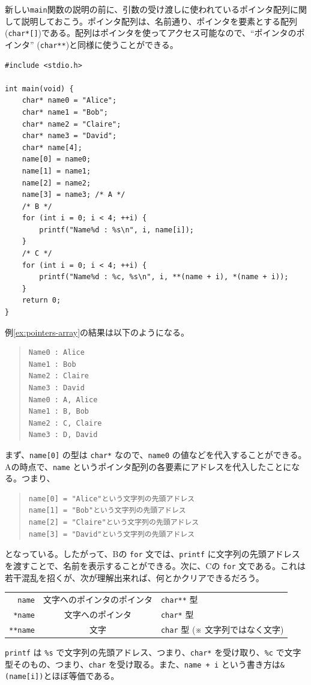 新しい\texttt{main}関数の説明の前に、引数の受け渡しに使われているポインタ配列に関して説明しておこう。ポインタ配列は、名前通り、ポインタを要素とする配列(\texttt{char*[]})である。配列はポインタを使ってアクセス可能なので、``ポインタのポインタ'' (\texttt{char**})と同様に使うことができる。
\begin{reidai}\label{ex:pointers-array}
    \begin{verbatim}
#include <stdio.h>

int main(void) {
    char* name0 = "Alice";
    char* name1 = "Bob";
    char* name2 = "Claire";
    char* name3 = "David";
    char* name[4];
    name[0] = name0;
    name[1] = name1;
    name[2] = name2;
    name[3] = name3; /* A */
    /* B */
    for (int i = 0; i < 4; ++i) {
        printf("Name%d : %s\n", i, name[i]);
    }
    /* C */
    for (int i = 0; i < 4; ++i) {
        printf("Name%d : %c, %s\n", i, **(name + i), *(name + i));
    }
    return 0;
}
\end{verbatim}
\end{reidai} \noindent
例\ref{ex:pointers-array}の結果は以下のようになる。
\begin{quote}
    \begin{verbatim}
Name0 : Alice
Name1 : Bob
Name2 : Claire
Name3 : David
Name0 : A, Alice
Name1 : B, Bob
Name2 : C, Claire
Name3 : D, David
\end{verbatim}
\end{quote}
まず、\texttt{name[0]} の型は \texttt{char*} なので、\texttt{name0} の値などを代入することができる。Aの時点で、\texttt{name} というポインタ配列の各要素にアドレスを代入したことになる。つまり、
\begin{quote}
    \begin{verbatim}
name[0] = "Alice"という文字列の先頭アドレス
name[1] = "Bob"という文字列の先頭アドレス
name[2] = "Claire"という文字列の先頭アドレス
name[3] = "David"という文字列の先頭アドレス
\end{verbatim}
\end{quote}
となっている。したがって、Bの \texttt{for} 文では、\texttt{printf} に文字列の先頭アドレスを渡すことで、名前を表示することができる。次に、Cの \texttt{for} 文である。これは若干混乱を招くが、次が理解出来れば、何とかクリアできるだろう。
\begin{table}[H]
    \centering
    \begin{tabular}{r@{ = }c@{ = }l}
        \texttt{name}   & 文字へのポインタのポインタ & \texttt{char**} 型                      \\
        \texttt{*name}  & 文字へのポインタ           & \texttt{char*} 型                       \\
        \texttt{**name} & 文字                       & \texttt{char} 型 (※ 文字列ではなく文字)
    \end{tabular}
\end{table}
\texttt{printf} は \texttt{\%s} で文字列の先頭アドレス、つまり、\texttt{char*} を受け取り、\texttt{\%c} で文字型そのもの、つまり、\texttt{char} を受け取る。また、\texttt{name + i} という書き方は\texttt{\&(name[i])}とほぼ等価である。

